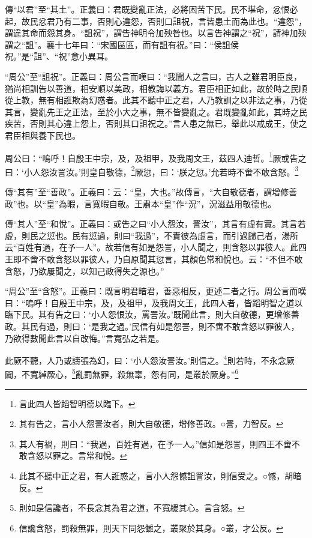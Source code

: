 {\noindent\zhuan{}\fzbyks 傳“以君”至“其土”。正義曰：君既變亂正法，必將困苦下民。民不堪命，忿恨必起，故民忿君乃有二事，否則心違怨，否則口詛祝，言皆患土而為此也。“違怨”，謂違其命而怨其身。“詛祝”，謂告神明令加殃咎也。以言告神謂之“祝”，請神加殃謂之“詛”。襄十七年曰：“宋國區區，而有詛有祝。”曰：“侯詛侯祝。”是“詛”、“祝”意小異耳。 \par}

{\noindent\shu{}\fzkt “周公”至“詛祝”。正義曰：周公言而嘆曰：“我聞人之言曰，古人之雖君明臣良，猶尚相訓告以善道，相安順以美政，相教誨以義方。君臣相正如此，故於時之民順從上教，無有相誑欺為幻惑者。此其不聽中正之君，人乃教訓之以非法之事，乃從其言，變亂先王之正法，至於小大之事，無不皆變亂之。君既變亂如此，其時之民疾苦，否則其心違上怨上，否則其口詛祝之。”言人患之無已，舉此以戒成王，使之君臣相與養下民也。 \par}

周公曰：“嗚呼！自殷王中宗，及，及祖甲，及我周文王，茲四人迪哲。\footnote{言此四人皆蹈智明德以臨下。}厥或告之曰：‘小人怨汝詈汝。’則皇自敬德，\footnote{其有告之，言小人怨詈汝者，則大自敬德，增修善政。○詈，力智反。}厥愆，曰：‘朕之愆。’允若時不啻不敢含怒。\footnote{其人有禍，則曰：“我過，百姓有過，在予一人。”信如是怨詈，則四王不啻不敢含怒以罪之。言常和悅。}


{\noindent\zhuan{}\fzbyks 傳“其有”至“善政”。正義曰：云：“皇，大也。”故傳言，“大自敬德者，謂增修善政”也。以“皇”為暇，言寬暇自敬。王肅本“皇”作“況”，況滋益用敬德也。 \par}

{\noindent\zhuan{}\fzbyks 傳“其人”至“和悅”。正義曰：或告之曰“小人怨汝，詈汝”，其言有虛有實。其言若虛，則民之愆也。民有愆過，則曰“我過”，不責彼為虛言，而引過歸己者，湯所云“百姓有過，在予一人”。故若信有如是怨詈，小人聞之，則含怒以罪彼人。此四王即不啻不敢含怒以罪彼人，乃自原聞其愆言，其顏色常和悅也。云：“不但不敢含怒，乃欲屢聞之，以知己政得失之源也。” \par}

{\noindent\shu{}\fzkt “周公”至“含怒”。正義曰：既言明君暗君，善惡相反，更述二者之行。周公言而嘆曰：“嗚呼！自殷王中宗，及，及祖甲，及我周文王，此四人者，皆蹈明智之道以臨下民。其有告之曰：‘小人怨恨汝，罵詈汝。’既聞此言，則大自敬德，更增修善政。其民有過，則曰：‘是我之過。’民信有如是怨詈，則不啻不敢含怒以罪彼人，乃欲得數聞此言以自改悔。”言寬弘之若是。 \par}

此厥不聽，人乃或譸張為幻，曰：‘小人怨汝詈汝。’則信之。\footnote{此其不聽中正之君，有人誑惑之，言小人怨憾詛詈汝，則信受之。○憾，胡暗反。}則若時，不永念厥闢，不寬綽厥心，\footnote{則如是信讒者，不長念其為君之道，不寬緩其心。言含怒。}亂罰無罪，殺無辜，怨有同，是叢於厥身。”\footnote{信讒含怒，罰殺無罪，則天下同怨讎之，叢聚於其身。○叢，才公反。}


